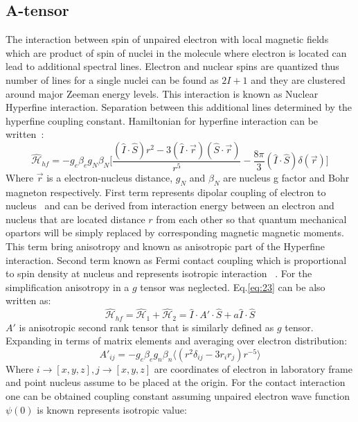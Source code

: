 \subsection{A-tensor}\label{atensorsection}
The interaction between spin of unpaired electron with local magnetic fields which are product of spin of nuclei in the molecule where electron is located can lead to additional spectral lines. Electron and nuclear spins are quantized thus number of lines for a single nuclei can be found as $2I+1$ and they are clustered around major Zeeman energy levels. This interaction is known as Nuclear Hyperfine interaction. Separation between this additional lines determined by the hyperfine coupling constant. Hamiltonian for hyperfine interaction can be written~\cite{nordio}: 
\begin{equation}\label{eq:23}
\mathcal{\hat{H}}_{hf}=-g_e\beta_eg_N\beta_N\Big[\frac{(\hat{I}\cdot \hat{S})r^2-3(\hat{I}\cdot\vec{r})(\hat{S}\cdot\vec{r})}{r^5}-\frac{8\pi}{3}(\hat{I}\cdot\hat{S})\delta(\vec{r})\Big]
\end{equation} 
Where $\vec{r}$ is a electron-nucleus distance, $g_N$ and $\beta_N$ are nucleus g factor and Bohr magneton respectively. First term represents dipolar coupling of electron to nucleus~\cite{car} and can be derived from interaction energy between an electron and nucleus that are located distance $r$ from each other so that quantum mechanical opartors will be simply replaced by corresponding magnetic magnetic moments. This term bring anisotropy and known as anisotropic part of the Hyperfine interaction. Second term known as Fermi contact coupling which is proportional to spin density at nucleus and represents isotropic interaction ~\cite{slich}. For the simplification anisotropy in a $g$ tensor was neglected. Eq.\ref{eq:23} can be also written as: 
\begin{equation}\label{eq:24}
\mathcal{\hat{H}}_{hf}= \mathcal{\hat{H}}_1+\mathcal{\hat{H}}_2=\hat{I}\cdot A'\cdot\hat{S}+a\hat{I}\cdot\hat{S}
\end{equation} 
$A'$ is anisotropic second rank tensor that is similarly defined as $g$ tensor. Expanding in terms of matrix elements and averaging over electron distribution:
\begin{equation}\label{eq:25}
A'_{ij}= -g_e\beta_eg_n\beta_n\langle(r^2\delta_{ij}-3r_ir_j)r^{-5}\rangle
\end{equation} 
Where $i\rightarrow[x,y,z],j\rightarrow[x,y,z]$ are coordinates of electron in laboratory frame and point nucleus assume to be placed at the origin. For the contact interaction one can be obtained coupling constant assuming unpaired electron wave function $\psi(0)$ is known represents isotropic value:
